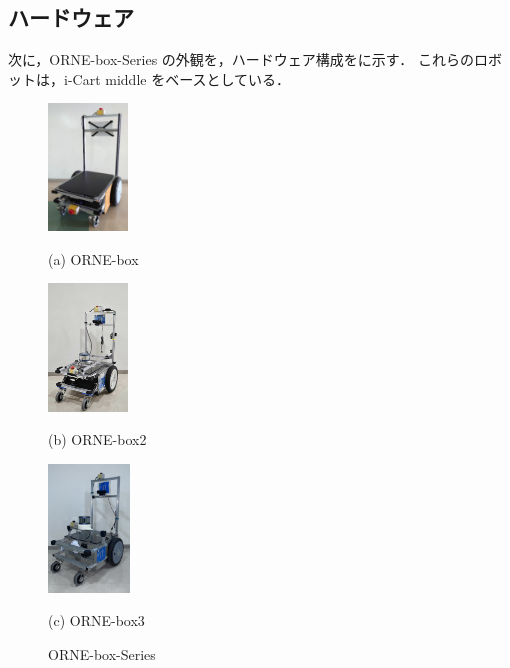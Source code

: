 \documentclass[twocolumn, 9pt]{jsproceedings}
\begin{document}
\subsection{ハードウェア}
次に，ORNE-box-Series の外観を，ハードウェア構成をに示す．
これらのロボットは，i-Cart middle をベースとしている．

\begin{figure}[h]
  \centering
  \begin{minipage}[b]{0.3\linewidth}
    \centering
    \includegraphics[width=21.1mm]{fig/box.pdf}
    \caption*{(a) ORNE-box}
  \end{minipage} 
  \hspace{-1.2mm}
  \begin{minipage}[b]{0.3\linewidth}
    \centering
    \includegraphics[height=34mm]{fig/box2.pdf}
    \caption*{(b) ORNE-box2}
  \end{minipage}
  \begin{minipage}[b]{0.3\linewidth}
    \centering
    \includegraphics[height=34mm]{fig/box3.pdf}
    \caption*{(c) ORNE-box3}
  \end{minipage}
  \caption{ORNE-box-Series}
  \label{fig:orne-series}
\end{figure}

\vspace*{-1mm}
\end{document}

